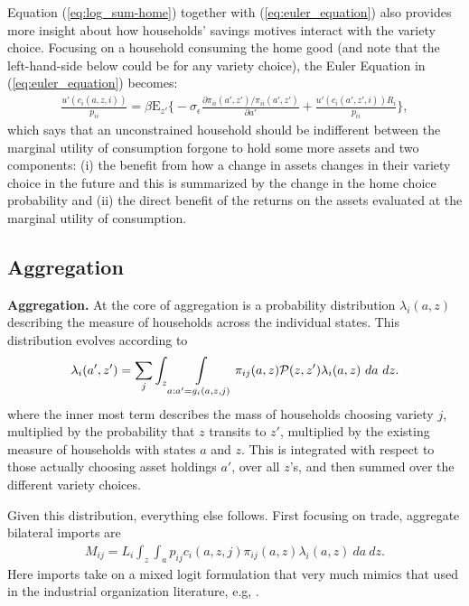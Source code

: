 \documentclass[12pt,pdftex]{article}
\begin{document}
\begin{onehalfspacing}
Equation (\ref{eq:log_sum-home}) together with (\ref{eq:euler_equation}) also provides more insight about how households' savings motives interact with the variety choice. Focusing on a household consuming the home good (and note that the left-hand-side below could be for any variety choice), the Euler Equation in (\ref{eq:euler_equation}) becomes:
\begin{align}
\frac{u'(c_{i}(a,z,i))}{p_{ii}} = \beta \mathrm{E}_{z'} \bigg \{ -\sigma_{\epsilon} \frac{\partial \pi_{ii}(a',z') / \pi_{ii}(a',z')}{\partial a'} + \frac{u'(c_{i}(a',z',i))R_i}{p_{ii}} \bigg \},
\label{eq:euler_equation-home}
\end{align}
which says that an unconstrained household should be indifferent between the marginal utility of consumption forgone to hold some more assets and two components: (i) the benefit from how a change in assets changes in their variety choice in the future and this is summarized by the change in the home choice probability and (ii) the direct benefit of the returns on the assets evaluated at the marginal utility of consumption.

\subsection{Aggregation}

\textbf{Aggregation.} At the core of aggregation is a probability distribution $\lambda_{i}(a, z)$ describing the measure of households across the individual states. This distribution evolves according to
\begin{align}
\lambda_i(a', z') = \sum_{j} \int_{z}\int\displaylimits_{a: a' = g_{i}(a, z, j)} \pi_{ij}(a, z) \mathcal{P}(z, z') \lambda_i(a, z) \ da \ dz.
\label{eq:law_motion}
\end{align}
where the inner most term describes the mass of households choosing variety $j$, multiplied by the probability that $z$ transits to $z'$, multiplied by the existing measure of households with states $a$ and $z$. This is integrated with respect to those actually choosing asset holdings $a'$, over all $z$'s, and then summed over the different variety choices.

Given this distribution, everything else follows. First focusing on trade, aggregate bilateral imports are
\begin{align}
M_{ij} = L_i \int_{z} \int_{a}  p_{ij} c_{i}(a, z, j) \pi_{ij}(a, z) \lambda_i(a, z) \ da \ dz.
\label{eq:imports}
\end{align}
Here imports take on a mixed logit formulation that very much mimics that used in the industrial organization literature, e.g, \citet*{berry1995automobile}.  


\end{onehalfspacing}
\end{document}
